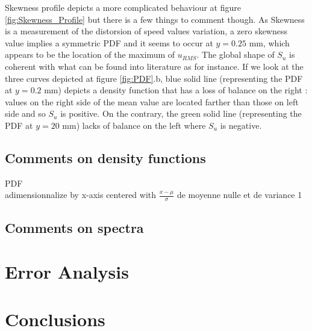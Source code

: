\documentclass[12pt]{article}
\begin{document}
Skewness profile depicts a more complicated behaviour at figure \ref{fig:Skewness_Profile} but there is a few things to comment though. As Skewness is a measurement of the distorsion of speed values variation, a zero skewness value implies a symmetric PDF and it seems to occur at $y = 0.25$ \si{mm}, which appears to be the location of the maximum of $u_{RMS}$. The global shape of $S_u$ is coherent with what can be found into literature as \cite{mathisRelationshipVelocitySkewness2011} for instance. If we look at the three curves depicted at figure \ref{fig:PDF}.b, blue solid line (representing the PDF at $y=0.2$ \si{mm}) depicts a density function that has a loss of balance on the right : values on the right side of the mean value are located farther than those on left side and so $S_u$ is positive. On the contrary, the green solid line (representing the PDF at $y=20$ \si{mm}) lacks of balance on the left where $S_u$ is negative.\\

\subsection{Comments on density functions}


PDF\\
adimensionnalize by x-axis centered with $\frac{x-\mu}{\sigma}$ de moyenne nulle et de variance 1

\subsection{Comments on spectra}

\section{Error Analysis}

\section{Conclusions}

\newpage


\end{document}
